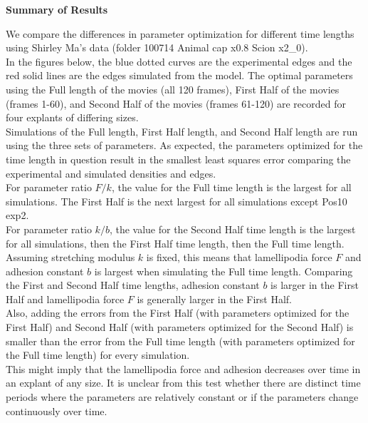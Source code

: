 \documentclass[12pt]{article}
\begin{document}
\vspace*{1in}
{\LARGE \textbf{Summary of Results}}
\vspace{.5in}

We compare the differences in parameter optimization for different time lengths using Shirley Ma's data (folder 100714 Animal cap x0.8 Scion x2\_0). \\

In the figures below, the blue dotted curves are the experimental edges and the red solid lines are the edges simulated from the model.  The optimal parameters using the Full length of the movies (all 120 frames), First Half of the movies (frames 1-60), and Second Half of the movies (frames 61-120) are recorded for four explants of differing sizes. \\

Simulations of the Full length, First Half length, and Second Half length are run using the three sets of parameters.  As expected, the parameters optimized for the time length in question result in the smallest least squares error comparing the experimental and simulated densities and edges. \\

For parameter ratio $F/k$, the value for the Full time length is the largest for all simulations.  The First Half is the next largest for all simulations except Pos10 exp2. \\

For parameter ratio $k/b$, the value for the Second Half time length is the largest for all simulations, then the First Half time length, then the Full time length. \\

Assuming stretching modulus $k$ is fixed, this means that lamellipodia force $F$ and adhesion constant $b$ is largest when simulating the Full time length.  Comparing the First and Second Half time lengths, adhesion constant $b$ is larger in the First Half and lamellipodia force $F$ is generally larger in the First Half. \\

Also, adding the errors from the First Half (with parameters optimized for the First Half) and Second Half (with parameters optimized for the Second Half)  is smaller than the error from the Full time length (with parameters optimized for the Full time length) for every simulation. \\

This might imply that the lamellipodia force and adhesion decreases over time in an explant of any size.  It is unclear from this test whether there are distinct time periods where the parameters are relatively constant or if the parameters change continuously over time.
\end{document}
